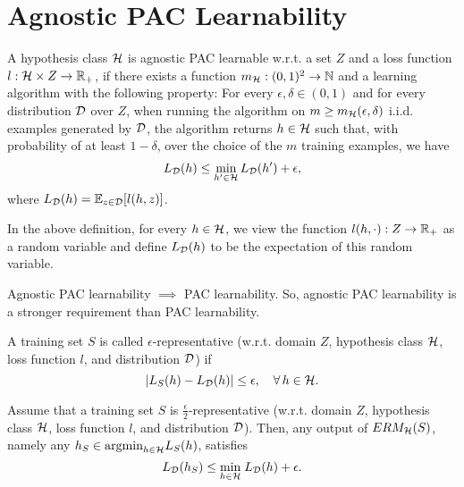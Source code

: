 \documentclass[11pt,a4paper]{article}
\begin{document}
\section{Agnostic PAC Learnability}

\begin{mydef}
A hypothesis class $\mathcal{H}$ is agnostic PAC learnable w.r.t. a set $Z$ and a loss function $l:\mathcal{H}\times Z\rightarrow \mathbb{R}_+$, if there exists a function $m_{\mathcal{H}}:(0,1)^2\rightarrow \mathbb{N}$ and a learning algorithm with the following property: For every $\epsilon,\delta\in(0,1)$ and for every distribution $\mathcal{D}$ over $Z$, when running the algorithm on $m\ge m_{\mathcal{H}}(\epsilon,\delta)$ i.i.d. examples generated by $\mathcal{D}$, the algorithm returns $h\in\mathcal{H}$ such that, with probability of at least $1-\delta$, over the choice of the $m$ training examples, we have
\begin{equation*}
    L_{\mathcal{D}}(h)\le \underset{h'\in\mathcal{H}}{\text{min}}\,L_{\mathcal{D}}(h')+\epsilon,
\end{equation*}
where $L_{\mathcal{D}}(h) = \mathbb{E}_{z\in\mathcal{D}}[l(h,z)]$.
\end{mydef}

\begin{remark}
In the above definition, for every $h\in \mathcal{H}$, we view the function $l(h,\cdot):Z\rightarrow \mathbb{R}_+$ as a random variable and define $L_{\mathcal{D}}(h)$ to be the expectation of this random variable.
\end{remark}

\begin{remark}
Agnostic PAC learnability $\implies$ PAC learnability. So, agnostic PAC learnability is a stronger requirement than PAC learnability.
\end{remark}

\begin{mydef}
A training set $S$ is called $\epsilon$-representative (w.r.t. domain $Z$, hypothesis class $\mathcal{H}$, loss function $l$, and distribution $\mathcal{D}$) if 
\begin{equation*}
    |L_S(h)-L_{\mathcal{D}}(h)|\le \epsilon,\quad \forall\, h\in\mathcal{H}.
\end{equation*}
\end{mydef}

\begin{prop}
Assume that a training set $S$ is $\frac{\epsilon}{2}$-representative (w.r.t. domain $Z$, hypothesis class $\mathcal{H}$, loss function $l$, and distribution $\mathcal{D}$). Then, any output of $ERM_{\mathcal{H}}(S)$, namely any $h_S\in\text{argmin}_{h\in\mathcal{H}} L_S(h)$, satisfies
\begin{equation*}
    L_{\mathcal{D}}(h_S)\le \underset{h\in\mathcal{H}}{\text{min}}\; L_{\mathcal{D}}(h) + \epsilon.
\end{equation*}
\end{prop}
\end{document}
